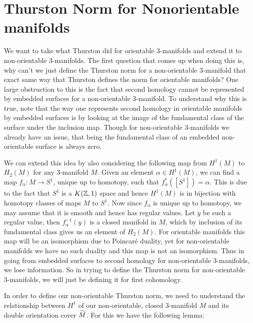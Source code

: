 \section{Thurston Norm for Nonorientable manifolds}

We want to take what Thurston did for orientable 3-manifolds and extend it to non-orientable 3-manifolds. The first question that comes up when doing this is, why can't we just define the Thurston norm for a non-orientable 3-manifold that exact same way that Thurston defines the norm for orientable manifolds? One large obstruction to this is the fact that second homology cannot be represented by embedded surfaces for a non-orientable 3-manifold. To understand why this is true, note that the way one represents second homology in orientable manifolds by embedded surfaces is by looking at the image of the fundamental class of the surface under the inclusion map. Though for non-orientable 3-manifolds we already have an issue, that being the fundamental class of an embedded non-orientable surface is always zero.

We can extend this idea by also considering the following map from $H^1(M)$ to $H_2(M)$ for any 3-manifold $M$. Given an element $\alpha \in H^1(M)$, we can find a map $f_\alpha: M \xrightarrow[]{} S^1$, unique up to homotopy, such that $f_\alpha^*([S^1]) = \alpha$. This is due to the fact that $S^1$ is a $K(\mathbb{Z},1)$ space and hence $H^1(M)$ is in bijection with homotopy classes of maps $M$ to $S^1$. Now since $f_\alpha$ is unique up to homotopy, we may assume that it is smooth and hence has regular values. Let $y$ be such a regular value, then $f_\alpha^{-1}(y)$ is a closed manifold in $M$, which by inclusion of its fundamental class gives us an element of $H_2(M)$. For orientable manifolds this map will be an isomorphism due to Poincar\'e duality, yet for non-orientable manifolds we have no such duality and this map is not an isomorphism. Thus in going from embedded surfaces to second homology for non-orientable 3-manifolds, we lose information. So in trying to define the Thurston norm for non-orientable 3-manifolds, we will just be defining it for first cohomology.

In order to define our non-orientable Thurston norm, we need to understand the relationship between $H^1$ of our non-orientable, closed 3-manifold $M$ and its double orientation cover $\widetilde{M}$. For this we have the following lemma:

